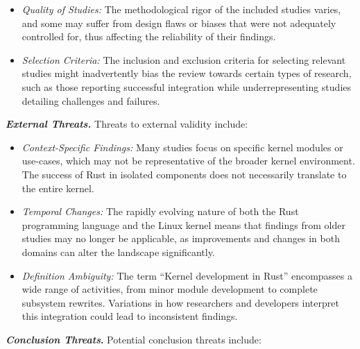 \documentclass[sigconf]{acmart}
\begin{document}
\begin{itemize}
  \item \textit{Quality of Studies:} The methodological rigor of the included studies varies, and some may
    suffer from design flaws or biases that were not adequately controlled for, thus affecting the
    reliability of their findings.
  \item  \textit{Selection Criteria:} The inclusion and exclusion criteria for selecting relevant studies might inadvertently bias the review towards certain types of research, such as those reporting successful integration while underrepresenting studies detailing challenges and failures.
\end{itemize}

\textit{\textbf{External Threats.}} 
Threats to external validity include:

\begin{itemize}
  \item \textit{Context-Specific Findings:} Many studies focus on specific kernel modules or use-cases, which
    may not be representative of the broader kernel environment. The success of Rust in isolated
    components does not necessarily translate to the entire kernel.
  \item \textit{Temporal Changes:} The rapidly evolving nature of both the Rust programming language and the
    Linux kernel means that findings from older studies may no longer be applicable, as improvements
    and changes in both domains can alter the landscape significantly.
    \item \textit{Definition Ambiguity:} The term ``Kernel development in Rust'' encompasses a wide range of activities,
    from minor module development to complete subsystem rewrites. Variations in how researchers and
    developers interpret this integration could lead to inconsistent findings.
\end{itemize}


\textbf{\textit{Conclusion Threats}.}
Potential conclusion threats include:
\end{document}
